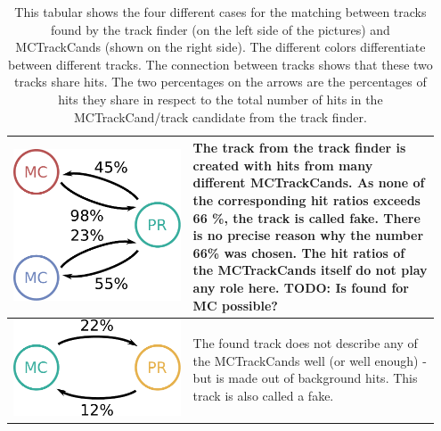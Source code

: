 \begin{table}
\begin{tabular}{m{0.4\linewidth}m{0.55\linewidth}}
    \centering \includegraphics[width=0.8\linewidth]{figures/theory/fom_fake.pdf} & The track from the track finder is created with hits from many different MCTrackCands. As none of the corresponding hit ratios exceeds 66 \%, the track is called fake. There is no precise reason why the number 66\% was chosen. The hit ratios of the MCTrackCands itself do not play any role here. TODO: Is found for MC possible? \\  \midrule
    \centering \includegraphics[width=0.8\linewidth]{figures/theory/fom_background.pdf} & The found track does not describe any of the MCTrackCands well (or well enough) - but is made out of background hits. This track is also called a fake. \\ \bottomrule
  \end{tabular}
  \caption[Matching routine for compiling the FOM.]{This tabular shows the four different cases for the matching between tracks found by the track finder (on the left side of the pictures) and MCTrackCands (shown on the right side). The different colors differentiate between different tracks. The connection between tracks shows that these two tracks share hits. The two percentages on the arrows are the percentages of hits they share in respect to the total number of hits in the MCTrackCand/track candidate from the track finder.}
  \label{tab-mc-track-finder}
\end{table}

